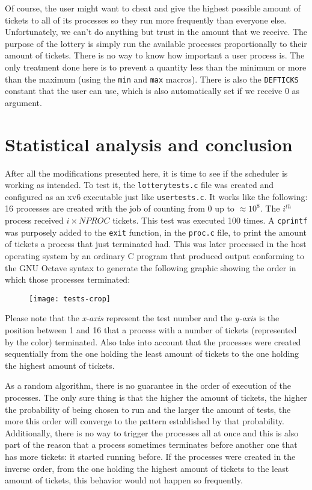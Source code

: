 \documentclass[12pt]{article}
\begin{document}
Of course, the user might want to cheat and give the highest possible
amount of tickets to all of its processes so they run more frequently
than everyone else. Unfortunately, we can't do anything but trust in the
amount that we receive. The purpose of the lottery is simply run the
available processes proportionally to their amount of tickets. There is
no way to know how important a user process is. The only treatment done
here is to prevent a quantity less than the minimum or more than the
maximum (using the \texttt{min} and \texttt{max} macros). There is also the \texttt{DEFTICKS} constant that the user can
use, which is also automatically set if we receive 0 as argument.

\section{Statistical analysis and conclusion}
After all the modifications presented here, it is time to see if the
scheduler is working as intended. To test it, the
\texttt{lotterytests.c} file was created and configured as an xv6
executable just like \texttt{usertests.c}. It works like the following:
16 processes are created with the job of counting from 0 up to
$\approx 10^8$. The $i^{th}$ process received $i \times NPROC$ tickets. This
test was executed 100 times. A \texttt{cprintf} was purposely added to
the \texttt{exit} function, in the \texttt{proc.c} file, to print the
amount of tickets a process that just terminated had. This was later
processed in the host operating system by an ordinary C program that produced output conforming to the GNU Octave syntax to generate the following graphic showing the order in which those processes terminated:

\begin{figure}[h]
\texttt{[image: tests-crop]}
\centering
\end{figure}

Please note that the \emph{x-axis} represent the test number and the
\emph{y-axis} is the position between 1 and 16 that a process with a
number of tickets (represented by the color) terminated. Also take into
account that the processes were created sequentially from the one
holding the least amount of tickets to the one holding the highest
amount of tickets.

As a random algorithm, there is no
guarantee in the order of execution of the processes. The only sure
thing is that the higher the amount of tickets, the higher the
probability of being chosen to run and the larger the amount of tests,
the more this order will converge to the pattern established by that
probability. Additionally, there is no way to trigger the processes all at
once and this is also part of the reason that a process sometimes terminates
before another one that has more tickets: it started running before. If
the processes were created in the inverse order, from the one holding
the highest amount of tickets to the least amount of tickets, this
behavior would not happen so frequently.
\end{document}
